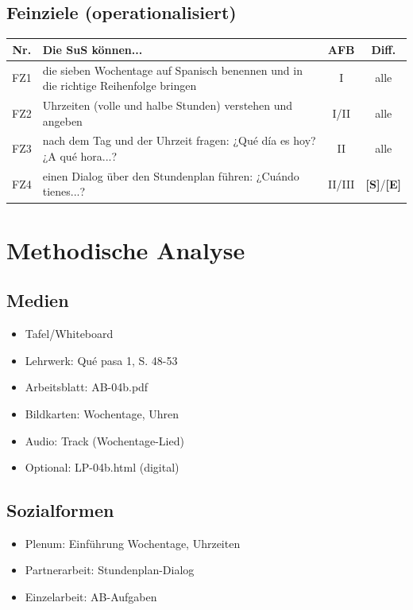 \documentclass[11pt,a4paper]{article}
\newcommand{\lehrwerk}{Qué pasa 1}
\newcommand{\lehrwerkseite}{S. 48-53}
\newcommand{\Std}{\textcolor{standard}{\textbf{[S]}}}
\newcommand{\E}{\textcolor{erweiterung}{\textbf{[E]}}}
\begin{document}
\subsection{Feinziele (operationalisiert)}
\begin{tabular}{|c|p{8cm}|c|c|}
\hline
\textbf{Nr.} & \textbf{Die SuS können...} & \textbf{AFB} & \textbf{Diff.} \\
\hline
FZ1 & die sieben Wochentage auf Spanisch benennen und in die richtige Reihenfolge bringen & I & alle \\
\hline
FZ2 & Uhrzeiten (volle und halbe Stunden) verstehen und angeben & I/II & alle \\
\hline
FZ3 & nach dem Tag und der Uhrzeit fragen: ¿Qué día es hoy? ¿A qué hora...? & II & alle \\
\hline
FZ4 & einen Dialog über den Stundenplan führen: ¿Cuándo tienes...? & II/III & \Std{}/\E{} \\
\hline
\end{tabular}

\section{Methodische Analyse}

\subsection{Medien}
\begin{itemize}
    \item Tafel/Whiteboard
    \item Lehrwerk: \lehrwerk, \lehrwerkseite
    \item Arbeitsblatt: AB-04b.pdf
    \item Bildkarten: Wochentage, Uhren
    \item Audio: Track (Wochentage-Lied)
    \item Optional: LP-04b.html (digital)
\end{itemize}

\subsection{Sozialformen}
\begin{itemize}
    \item Plenum: Einführung Wochentage, Uhrzeiten
    \item Partnerarbeit: Stundenplan-Dialog
    \item Einzelarbeit: AB-Aufgaben
\end{itemize}
\end{document}
